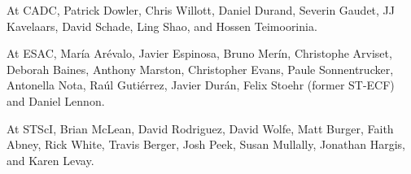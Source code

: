 \documentclass[11pt,twoside]{article}
\begin{document}
At CADC, Patrick Dowler, Chris Willott, Daniel Durand, Severin Gaudet, JJ Kavelaars, David Schade, Ling Shao, and Hossen Teimoorinia.

At ESAC, María Arévalo, Javier Espinosa, Bruno Merín, Christophe Arviset, Deborah Baines, Anthony Marston, Christopher Evans, Paule Sonnentrucker, Antonella Nota, Raúl Gutiérrez, Javier Durán, Felix Stoehr (former ST-ECF) and Daniel Lennon.

At STScI, Brian McLean, David Rodriguez, David Wolfe, Matt Burger, Faith Abney, Rick White, Travis Berger, Josh Peek, Susan Mullally, Jonathan Hargis, and Karen Levay.


\end{document}
